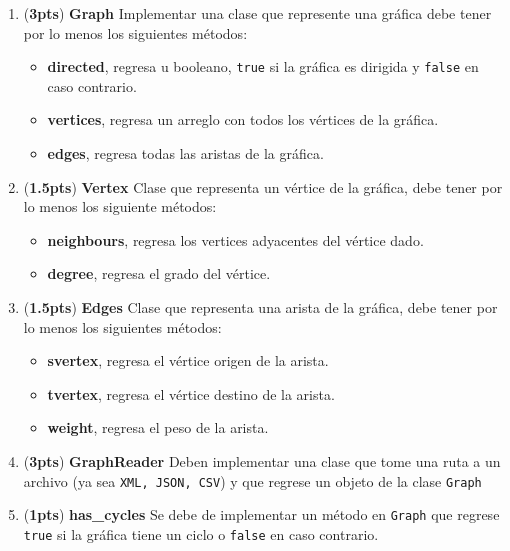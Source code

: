 \documentclass{article}
\newcommand{\grade}[1]{(\textbf{#1pts}) }
\begin{document}
\begin{enumerate}

\item \grade{3} \textbf{Graph} Implementar una clase que represente una gráfica debe tener por lo menos los siguientes métodos:

  \begin{itemize}
  \item \textbf{directed}, regresa u booleano, \texttt{true} si la gráfica es dirigida y \texttt{false} en caso contrario.
  \item \textbf{vertices}, regresa un arreglo con todos los vértices de la gráfica.
  \item \textbf{edges}, regresa todas las aristas de la gráfica.
  \end{itemize}

\item \grade{1.5} \textbf{Vertex} Clase que representa un vértice de la gráfica, debe tener por lo menos los siguiente métodos:

  \begin{itemize}
  \item \textbf{neighbours}, regresa los vertices adyacentes del vértice dado.
  \item \textbf{degree}, regresa el grado del vértice.
  \end{itemize}

\item \grade{1.5} \textbf{Edges} Clase que representa una arista de la gráfica, debe tener por lo menos los siguientes métodos:

  \begin{itemize}
  \item \textbf{svertex}, regresa el vértice origen de la arista.
  \item \textbf{tvertex}, regresa el vértice destino de la arista.
  \item \textbf{weight}, regresa el peso de la arista.
  \end{itemize}

 \item \grade{3} \textbf{GraphReader} Deben implementar una clase que tome una ruta a un archivo (ya sea \texttt{XML, JSON, CSV}) y que regrese un objeto de la clase \texttt{Graph}

 \item \grade{1} \textbf{has\_cycles} Se debe de implementar un método en \texttt{Graph} que regrese \texttt{true} si la gráfica tiene un ciclo o \texttt{false} en caso contrario.


\end{enumerate}
\end{document}
